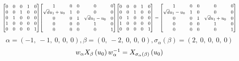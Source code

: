 \documentclass[11pt]{article}
\theoremstyle{definition}
\begin{document}
\[
\scaletoalign{\textwidth}{{\left[\begin{matrix}0 & 0 & 0 & 1 & 0\\0 & 0 & 1 & 0 & 0\\0 & 1 & 0 & 0 & 0\\1 & 0 & 0 & 0 & 0\\0 & 0 & 0 & 0 & 1\end{matrix}\right]} {\left[\begin{matrix}1 & 0 & 0 & 0 & 0\\\sqrt{d} u_{1} + u_{0} & 1 & 0 & 0 & 0\\0 & 0 & 1 & \sqrt{d} u_{1} - u_{0} & 0\\0 & 0 & 0 & 1 & 0\\0 & 0 & 0 & 0 & 1\end{matrix}\right]} {\left[\begin{matrix}0 & 0 & 0 & 1 & 0\\0 & 0 & 1 & 0 & 0\\0 & 1 & 0 & 0 & 0\\1 & 0 & 0 & 0 & 0\\0 & 0 & 0 & 0 & 1\end{matrix}\right]} = {\left[\begin{matrix}1 & 0 & 0 & 0 & 0\\\sqrt{d} u_{1} - u_{0} & 1 & 0 & 0 & 0\\0 & 0 & 1 & \sqrt{d} u_{1} + u_{0} & 0\\0 & 0 & 0 & 1 & 0\\0 & 0 & 0 & 0 & 1\end{matrix}\right]}}
\]
\[
\alpha = \left( -1, \  -1, \  0, \  0, \  0\right), \beta = \left( 0, \  -2, \  0, \  0, \  0\right), \sigma_{\alpha}(\beta) = \left( 2, \  0, \  0, \  0, \  0\right)
\]
\[
\scaletoalign{\textwidth}{w_{\alpha} X_{\beta}\left(u_{0}\right) w_{\alpha}^{-1} = X_{\sigma_{\alpha}\left(\beta\right)}\left(u_{0}\right)}
\]
\end{document}
